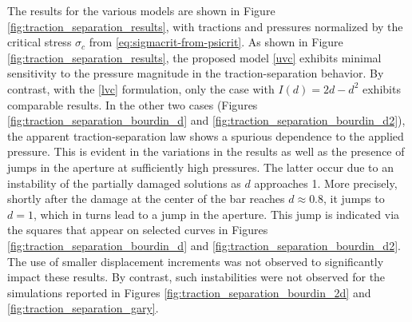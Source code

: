 The results for the various models are shown in Figure \ref{fig:traction_separation_results}, with tractions and pressures normalized by the critical stress $\sigma_c$ from \eqref{eq:sigmacrit-from-psicrit}.
As shown in Figure \ref{fig:traction_separation_results}, the proposed model \eqref{uvc} exhibits minimal sensitivity to the pressure magnitude in the traction-separation behavior.  
By contrast, with the \eqref{lvc} formulation, only the case with $I(d) = 2d - d^2$ exhibits comparable results. In the other two cases (Figures \ref{fig:traction_separation_bourdin_d} and \ref{fig:traction_separation_bourdin_d2}), the apparent traction-separation law shows a spurious dependence to the applied pressure. This is evident in the variations in the results as well as the presence of jumps in the aperture at sufficiently high pressures. The latter occur due to an instability of the partially damaged solutions as $d$ approaches 1. More precisely, shortly after the damage at the center of the bar reaches $d\approx 0.8$, it jumps to $d= 1$, which in turns lead to a jump in the aperture.  
 This jump is indicated via the squares that appear on selected curves in Figures \ref{fig:traction_separation_bourdin_d} and \ref{fig:traction_separation_bourdin_d2}. The use of smaller displacement increments was not observed to significantly impact these results.   By contrast, such instabilities were not observed for the simulations reported in  Figures \ref{fig:traction_separation_bourdin_2d} and \ref{fig:traction_separation_gary}.




